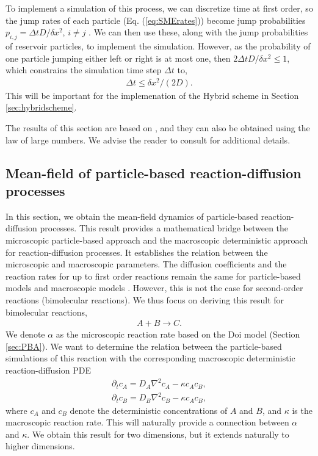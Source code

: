 \documentclass[10pt,twocolumn]{revtex4-1}
\begin{document}
	To implement a simulation of this process, we can discretize time at first order, so the jump rates of each particle (Eq. (\ref{eq:SMErates})) become jump probabilities $p_{i,j}=\Delta t D /\delta x ^{2}$, $i\neq j$ \cite{del2016discrete}. We can then use these, along with the jump probabilities of reservoir particles, to implement the simulation. However, as the probability of one particle jumping either left or right is at most one, then $2\Delta t D /\delta x ^{2}\leq 1$, which constrains the simulation time step $\Delta t$ to, 
	\begin{align}
	\Delta t \leq \delta x^2/(2D).
	\label{eq:maxdeltat}
	\end{align}
	This will be important for the implemenation of the Hybrid scheme in Section \ref{sec:hybridscheme}.
	
	The results of this section are based on \cite{del2018grand}, and they can also be obtained using the law of large numbers. We advise the reader to consult \cite{del2018grand} for additional details.
	
	
	\subsection{Mean-field of particle-based reaction-diffusion processes} \label{sec:RDprocMF}
	In this section, we obtain the mean-field dynamics of particle-based reaction-diffusion processes. This result provides a mathematical bridge between the microscopic particle-based approach and the macroscopic deterministic approach for reaction-diffusion processes. It establishes the relation between the microscopic and macroscopic parameters. The diffusion coefficients and the reaction rates for up to first order reactions remain the same for particle-based models and macroscopic models \cite{del2018grand}. However, this is not the case for second-order reactions (bimolecular reactions). We thus focus on deriving this result for bimolecular reactions, 
	\begin{align}
	A+B \rightarrow C.
	\end{align}
	We denote $\alpha$ as the microscopic reaction rate based on the Doi model (Section \ref{sec:PBA}). We want to determine the relation between the particle-based simulations of this reaction with the corresponding macroscopic deterministic reaction-diffusion PDE
	\begin{align}
	\partial_t c_A = D_A \nabla^2 c_A - \kappa c_A c_B, \label{eq:exRDPDE} \\
	\partial_t c_B = D_B \nabla^2 c_B - \kappa c_A c_B, \nonumber
	\end{align}
	where $c_A$ and $c_B$ denote the deterministic concentrations of $A$ and $B$, and $\kappa$ is the macroscopic reaction rate. This will naturally provide a connection between $\alpha$ and $\kappa$. We obtain this result for two dimensions, but it extends naturally to higher dimensions.
	
\end{document}
